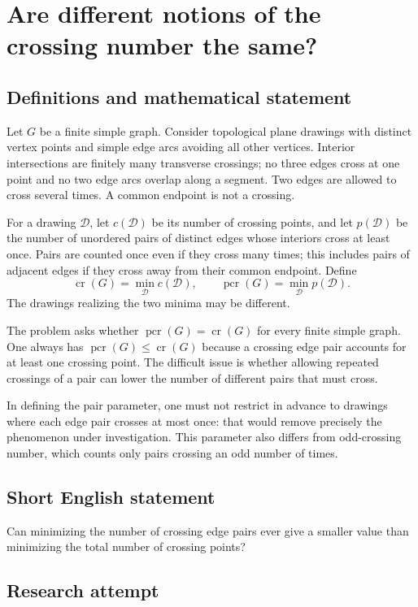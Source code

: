 \documentclass[11pt,a4paper]{article}
\begin{document}
\section*{Are different notions of the crossing number the same?}\label{statement}

\subsection{Definitions and mathematical statement}
Let $G$ be a finite simple graph. Consider topological plane drawings
with distinct vertex points and simple edge arcs avoiding all other
vertices. Interior intersections are finitely many transverse
crossings; no three edges cross at one point and no two edge arcs
overlap along a segment. Two edges are allowed to cross several
times. A common endpoint is not a crossing.

For a drawing $\mathcal D$, let $c(\mathcal D)$ be its number of
crossing points, and let $p(\mathcal D)$ be the number of unordered
pairs of distinct edges whose interiors cross at least once. Pairs
are counted once even if they cross many times; this includes pairs
of adjacent edges if they cross away from their common endpoint.
Define
\[
 \operatorname{cr}(G)=\min_{\mathcal D}c(\mathcal D),
 \qquad
 \operatorname{pcr}(G)=\min_{\mathcal D}p(\mathcal D).
\]
The drawings realizing the two minima may be different.

The problem asks whether $\operatorname{pcr}(G)=\operatorname{cr}(G)$
for every finite simple graph. One always has
$\operatorname{pcr}(G)\le\operatorname{cr}(G)$ because a crossing edge
pair accounts for at least one crossing point. The difficult issue
is whether allowing repeated crossings of a pair can lower the
number of different pairs that must cross.

In defining the pair parameter, one must not restrict in advance
to drawings where each edge pair crosses at most once: that would
remove precisely the phenomenon under investigation. This parameter
also differs from odd-crossing number, which counts only pairs
crossing an odd number of times.
\subsection{Short English statement}
Can minimizing the number of crossing edge pairs ever give a smaller value than minimizing the total number of crossing points?
\subsection{Research attempt}
\end{document}
